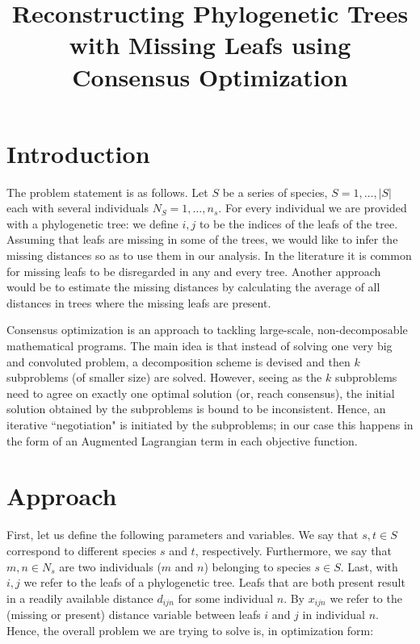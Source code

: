 \documentclass[12pt]{amsart}
\title[Missing Leafs]{Reconstructing Phylogenetic Trees with Missing Leafs using Consensus Optimization}
\author{}
\date{} %
\begin{document}
\maketitle

\section{Introduction}

The problem statement is as follows. Let $S$ be a series of species, $S=1, \dots, |S|$ each with several individuals $N_S=1, \dots, n_s$. For every individual we are provided with a phylogenetic tree: we define $i,j$ to be the indices of the leafs of the tree. Assuming that leafs are missing in some of the trees, we would like to infer the missing distances so as to use them in our analysis. In the literature it is common for missing leafs to be disregarded in any and every tree. Another approach would be to estimate the missing distances by calculating the average of all distances in trees where the missing leafs are present. 

Consensus optimization is an approach to tackling large-scale, non-decomposable mathematical programs. The main idea is that instead of solving one very big and convoluted problem, a decomposition scheme is devised and then $k$ subproblems (of smaller size) are solved. However, seeing as the $k$ subproblems need to agree on exactly one optimal solution (or, reach consensus), the initial solution obtained by the subproblems is bound to be inconsistent. Hence, an iterative ``negotiation" is initiated by the subproblems; in our case this happens in the form of an Augmented Lagrangian term in each objective function. 

\section{Approach}

First, let us define the following parameters and variables. We say that $s, t\in S$ correspond to different species $s$ and $t$, respectively. Furthermore, we say that $m, n\in N_s$ are two individuals ($m$ and $n$) belonging to species $s\in S$. Last, with $i,j$ we refer to the leafs of a phylogenetic tree. Leafs that are both present result in a readily available distance $d_{ijn}$ for some individual $n$. By $x_{ijn}$ we refer to the (missing or present) distance variable between leafs $i$ and $j$ in individual $n$. Hence, the overall problem we are trying to solve is, in optimization form: 
\end{document}
